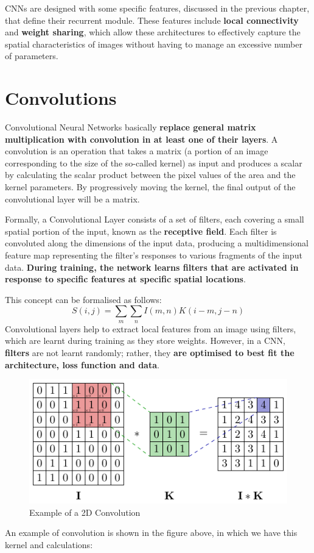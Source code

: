 CNNs are designed with some specific features, discussed in the previous chapter, that define their recurrent module. These features include \textbf{local connectivity} and \textbf{weight sharing}, which allow these architectures to effectively capture the spatial characteristics of images without having to manage an excessive number of parameters.

\section{Convolutions}

Convolutional Neural Networks basically \textbf{replace general matrix multiplication with convolution in at least one of their layers}. A convolution is an operation that takes a matrix (a portion of an image corresponding to the size of the so-called kernel) as input and produces a scalar by calculating the scalar product between the pixel values of the area and the kernel parameters. By progressively moving the kernel, the final output of the convolutional layer will be a matrix. 

Formally, a Convolutional Layer consists of a set of filters, each covering a small spatial portion of the input, known as the \textbf{receptive field}. Each filter is convoluted along the dimensions of the input data, producing a multidimensional feature map representing the filter's responses to various fragments of the input data. \textbf{During training, the network learns filters that are activated in response to specific features at specific spatial locations}.

This concept can be formalised as follows:
$$
S(i,j) = \sum_{m}\sum_{n} I(m,n)K(i-m,j-n)
$$
Convolutional layers help to extract local features from an image using filters, which are learnt during training as they store weights. However, in a CNN, \textbf{filters} are not learnt randomly; rather, they \textbf{are optimised to best fit the architecture, loss function and data}.


\begin{figure}[!htbp]
    \centering
    \includegraphics[width=\textwidth]{tikz/chapter5 - Convolution.pdf}
    \caption{Example of a 2D Convolution}
\end{figure}
An example of convolution is shown in the figure above, in which we have this kernel and calculations:

